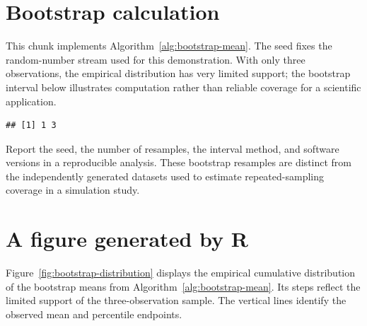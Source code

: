 

\section{Bootstrap calculation}
This chunk implements Algorithm~\ref{alg:bootstrap-mean}. The seed fixes the
random-number stream used for this demonstration. With only three
observations, the empirical distribution has very limited support; the
bootstrap interval below illustrates computation rather than reliable
coverage for a scientific application.

\begin{knitrout}
\color{fgcolor}\begin{kframe}
\begin{alltt}
\hldef{(}\hldef{)}
 \hlkwb{<-} 
 \hlkwb{<-} 
 \hlkwb{<-} \hldef{(}
   \hldef{(}    \hldef{=} \hldef{))}
\hldef{)}
          \hldef{=}  \hlopt{/} \hldef{,}  \hlopt{-}  \hlopt{/} \hldef{),}  \hldef{=} \hldef{)}
\end{alltt}
\begin{verbatim}
## [1] 1 3
\end{verbatim}
\end{kframe}
\end{knitrout}

Report the seed, the number of resamples, the interval method, and software
versions in a reproducible
analysis. These bootstrap resamples are distinct from the independently
generated datasets used to estimate repeated-sampling coverage in a simulation
study.


\section{A figure generated by R}
Figure~\ref{fig:bootstrap-distribution} displays the empirical cumulative
distribution of the bootstrap means from Algorithm~\ref{alg:bootstrap-mean}.
Its steps reflect the limited support of the three-observation sample.
The vertical lines identify the observed mean and percentile endpoints.



